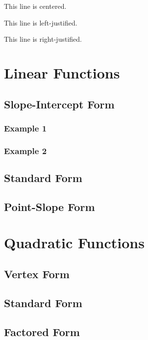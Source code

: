 \documentclass[10pt, letterpaper]{article}
\begin{document}
\vspace{1 cm}

\tiny
This line is centered. 

This line is left-justified.

This line is right-justified.

\raggedright
\section{Linear Functions}
	\subsection{Slope-Intercept Form}
		\subsubsection{Example 1}
		\subsubsection{Example 2}
	\subsection{Standard Form}
	\subsection{Point-Slope Form}
\section{Quadratic Functions}
	\subsection{Vertex Form}
	\subsection{Standard Form}
	\subsection{Factored Form}
\end{document}
